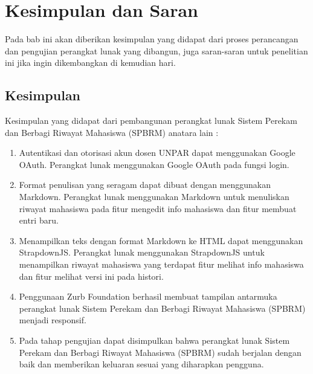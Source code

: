 \chapter{Kesimpulan dan Saran}
\label{chap:kesimpulandansaran}

Pada bab ini akan diberikan kesimpulan yang didapat dari proses perancangan dan
pengujian perangkat lunak yang dibangun, juga saran-saran untuk penelitian ini
jika ingin dikembangkan di kemudian hari.

\section{Kesimpulan}
\label{sec:kesimpulan}
Kesimpulan yang didapat dari pembangunan perangkat lunak Sistem Perekam dan Berbagi Riwayat Mahasiswa (SPBRM) anatara lain :
\begin{enumerate}[(1)]
  \item Autentikasi dan otorisasi akun dosen UNPAR dapat menggunakan Google OAuth. Perangkat lunak menggunakan Google OAuth pada fungsi login. 
  \item Format penulisan yang seragam dapat dibuat dengan menggunakan Markdown. Perangkat lunak menggunakan Markdown untuk menuliskan riwayat mahasiswa pada fitur mengedit info mahasiswa dan fitur membuat entri baru.
  \item Menampilkan teks dengan format Markdown ke HTML dapat menggunakan StrapdownJS. Perangkat lunak menggunakan StrapdownJS untuk menampilkan riwayat mahasiswa yang terdapat fitur melihat info mahasiswa dan fitur melihat versi ini pada histori.
  \item Penggunaan Zurb Foundation berhasil membuat tampilan antarmuka perangkat
  lunak Sistem Perekam dan Berbagi Riwayat Mahasiswa (SPBRM) menjadi responsif.
  \item Pada tahap pengujian dapat disimpulkan bahwa perangkat lunak Sistem
  Perekam dan Berbagi Riwayat Mahasiswa (SPBRM) sudah berjalan dengan baik dan memberikan
  keluaran sesuai yang diharapkan pengguna.
\end{enumerate}

